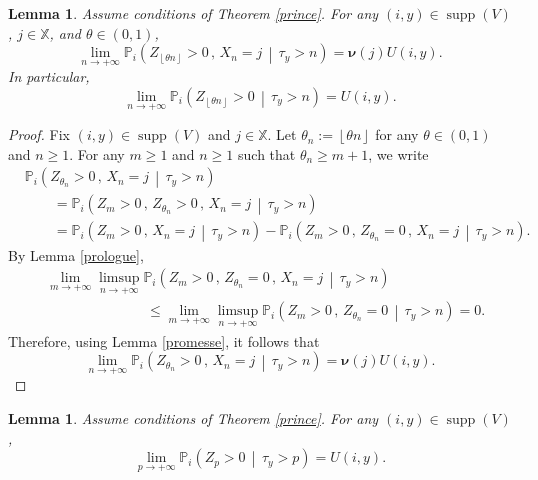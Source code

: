 \documentclass[12pt]{amsart}
\newtheorem{lemma}[theorem]{Lemma}
\theoremstyle{definition}
\numberwithin{equation}{section}
\newcommand*{\pent}[1]{\left\lfloor#1\right\rfloor}
\newcommand*{\sachant}[2]{\left.#1 \,\middle|\,#2\right.}
\def\bb#1{\mathbb{#1}}
\def\bs#1{\boldsymbol{#1}}
\def\geq{\geqslant}
\def\leq{\leqslant}
\DeclareMathOperator{\supp}{supp}
\begin{document}
\begin{lemma}
Assume conditions of Theorem \ref{prince}.
\label{rire}
For any $(i,y) \in \supp (V)$, $j \in \bb X$, and $\theta \in (0,1)$,
\[
\lim_{n\to+\infty} \bb P_i \left( \sachant{Z_{\pent{\theta n}} > 0 \,,\, X_n = j}{ \tau_y > n } \right) = \bs \nu(j) U(i,y).
\]
In particular,
\begin{equation}
	\label{chochutement}
	\lim_{n\to+\infty} \bb P_i \left( \sachant{Z_{\pent{\theta n}} > 0 }{ \tau_y > n } \right) = U(i,y).
\end{equation}
\end{lemma}

\begin{proof}
Fix $(i,y) \in \supp(V)$ and $j \in \bb X$. Let $\theta_n := \pent{\theta n}$ for any $\theta \in (0,1)$ and $n \geq 1$. For any $m \geq 1$ and $n \geq 1$ such that $\theta_n \geq m+1$, we write
\begin{align*}
	&\bb P_i \left( \sachant{Z_{\theta_n} > 0 \,,\, X_n = j}{ \tau_y > n } \right) \\
	&\qquad = \bb P_i \left( \sachant{Z_m > 0 \,,\, Z_{\theta_n} > 0 \,,\, X_n = j}{ \tau_y > n } \right) \\
	&\qquad = \bb P_i \left( \sachant{Z_m > 0 \,,\, X_n = j}{ \tau_y > n } \right) - \bb P_i \left( \sachant{Z_m > 0 \,,\, Z_{\theta_n} = 0 \,,\, X_n = j}{ \tau_y > n } \right).
\end{align*}
By Lemma \ref{prologue}, 
\begin{align*}
	&\lim_{m\to+\infty} \limsup_{n\to+\infty} \bb P_i \left( \sachant{Z_m > 0 \,,\, Z_{\theta_n} = 0 \,,\, X_n = j}{ \tau_y > n } \right) \\
	&\hspace{3cm} \leq \lim_{m\to+\infty} \limsup_{n\to+\infty} \bb P_i \left( \sachant{Z_m > 0 \,,\, Z_{\theta_n} = 0}{ \tau_y > n } \right) = 0.
\end{align*}
Therefore, using Lemma \ref{promesse}, it follows that
\[
\lim_{n\to+\infty} \bb P_i \left( \sachant{Z_{\theta_n} > 0 \,,\, X_n = j}{ \tau_y > n } \right) = \bs \nu(j) U(i,y).
\]
\end{proof}

\begin{lemma}
Assume conditions of Theorem \ref{prince}.
\label{main}
For any $(i,y) \in \supp (V)$,
\[
\lim_{p\to+\infty} \bb P_i \left( \sachant{ Z_p > 0 }{ \tau_y > p } \right) = U(i,y).
\]
\end{lemma}
\end{document}
